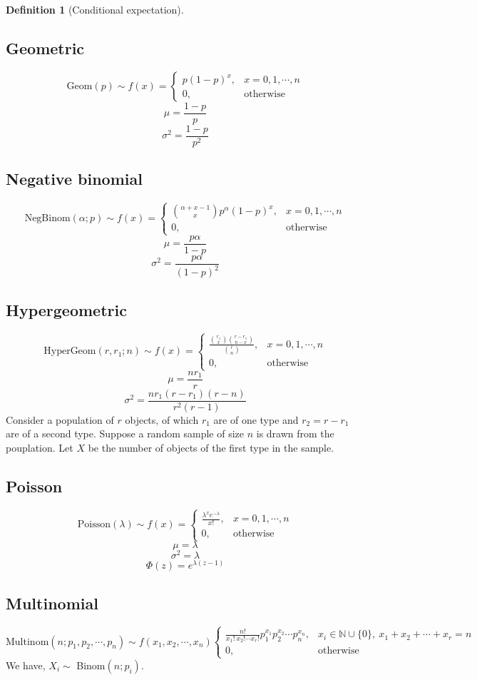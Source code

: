 \documentclass[10pt, a4paper]{extarticle}
\theoremstyle{definition}
\newtheorem{defn}{Definition}
\begin{document}
\begin{defn}[Conditional expectation]
	\subsection{Geometric}
	\[\text{Geom}(p)\sim f(x)=\begin{cases}
		p(1-p)^x,&x=0,1,\cdots,n\\
		0,&\text{otherwise}
	\end{cases}\]
	\[\mu=\frac{1-p}{p}\]
	\[\sigma^2=\frac{1-p}{p^2}\]

	\subsection{Negative binomial}
	\[\text{NegBinom}(\alpha;p)\sim f(x)=\begin{cases}
		\binom{\alpha +x-1}{x}p^\alpha(1-p)^x,&x=0,1,\cdots,n\\
		0,&\text{otherwise}
	\end{cases}\]
	\[\mu=\frac{p\alpha}{1-p}\]
	\[\sigma^2=\frac{p\alpha}{(1-p)^2}\]

	\subsection{Hypergeometric}
\[\text{HyperGeom}(r,r_1;n)\sim f(x)=\begin{cases}
		\frac{\binom{r_1}{x}\binom{r-r_1}{n-x}}{\binom{r}{n}},&x=0,1,\cdots,n\\
		0,&\text{otherwise}
	\end{cases}\]
	\[\mu=\frac{nr_1}{r}\]
	\[\sigma^2=\frac{nr_1(r-r_1)(r-n)}{r^2(r-1)}\]
	Consider a population of $r$ objects, of which $r_1$ are of one type and $r_2=r-r_1$ are of a second type. Suppose a random sample of size $n$ is drawn from the pouplation. Let $X$ be the number of objects of the first type in the sample.
	
	\subsection{Poisson}
	\[\text{Poisson}(\lambda)\sim f(x)=\begin{cases}
		\frac{\lambda^xe^{-\lambda}}{x!},&x=0,1,\cdots,n\\
		0,&\text{otherwise}
	\end{cases}\]
	\[\mu=\lambda\]
	\[\sigma^2=\lambda\]
	\[\Phi(z)=e^{\lambda(z-1)}\]

	\subsection{Multinomial}
	\[\text{Multinom}(n;p_1,p_2,\cdots,p_n)\sim f(x_1,x_2,\cdots,x_n)
	\begin{cases}
		\frac{n!}{x_1!\ x_2!\cdots x_r!}p_1^{x_1}p_2^{x_2}\cdots p_n^{x_n},& x_i\in\mathbb{N}\cup\{0\},\ x_1+x_2+\cdots + x_r=n\\
		0,&\text{otherwise}
	\end{cases}
	\]
	We have, $X_i\sim$ Binom$(n;p_i)$.


\end{defn}
\end{document}
